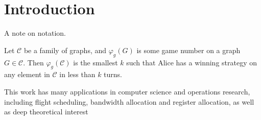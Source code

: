 \chapter{Introduction}
A note on notation.

    Let $\mathcal{C}$ be a family of graphs, and $\varphi_g(G)$ is some game number on a graph $G \in \mathcal{C}$. Then $\varphi_g(\mathcal{C})$ is the smallest $k$ such that Alice has a winning strategy on any element in $\mathcal{C}$ in less than $k$ turns.
    
    
    This work has many applications in computer science and operations research, including flight scheduling, bandwidth allocation and register allocation, as well as deep theoretical interest